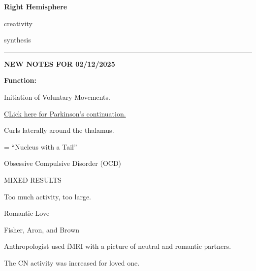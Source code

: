 \begin{coloredlist}
\begin{coloredlist}
\begin{coloredlist}
\begin{coloredlist}
        \end{coloredlist}
        \item \textbf{Right Hemisphere}
        \begin{coloredlist}
            \item creativity
            \item synthesis
        \end{coloredlist}
    \end{coloredlist}
\end{coloredlist}
\begin{center}
    \hrule
    \textbf{NEW NOTES FOR 02/12/2025}
\end{center}
\item {}
\begin{coloredlist}
\item \textbf{Function:}
\begin{coloredlist}
    \item Initiation of Voluntary Movements.
    \item \hyperref[parkinson]{CLick here for Parkinson's continuation.}
\end{coloredlist}
\item Curls laterally around the thalamus.
\item {}
\begin{coloredlist}
    \item {} = ``Nucleus with a Tail''
    \begin{coloredlist}
        \item Obsessive Compulsive Disorder (OCD)
        \begin{coloredlist}
            \item MIXED RESULTS
            \begin{coloredlist}
                \item Too much activity, too large.
            \end{coloredlist}
        \end{coloredlist}
        \item Romantic Love
        \begin{coloredlist}
            \item Fisher, Aron, and Brown
            \begin{coloredlist}
                \item Anthropologist used fMRI with a picture of neutral and romantic partners.
                \item The CN activity was increased for loved one.

\end{coloredlist}
\end{coloredlist}
\end{coloredlist}
\end{coloredlist}
\end{coloredlist}
\end{coloredlist}
